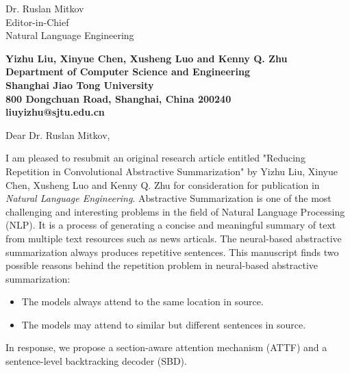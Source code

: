 \documentclass[11pt]{letter} %
\begin{document}

\begin{letter}{Dr. Ruslan Mitkov \\
Editor-in-Chief  \\
Natural Language Engineering} 


\begin{center}
\large\bf Yizhu Liu, Xinyue Chen, Xusheng Luo and Kenny Q. Zhu \\ %
Department of Computer Science and Engineering \\ Shanghai Jiao Tong University \\ 800 Dongchuan Road, Shanghai, China 200240 \\
liuyizhu@sjtu.edu.cn
\end{center} 
\vfill

\signature{Yizhu Liu} %


\opening{Dear Dr. Ruslan Mitkov,} 

I am pleased to resubmit an original research article entitled 
"Reducing Repetition in Convolutional Abstractive Summarization" by Yizhu Liu, Xinyue Chen, Xusheng Luo and Kenny Q. Zhu 
for consideration for publication in \textit{Natural Language Engineering}. 
Abstractive Summarization is one of the most challenging and interesting problems 
in the field of Natural Language Processing (NLP). 
It is a process of generating a concise and meaningful summary of text from multiple text resources 
such as news articals.
The neural-based abstractive summarization always produces repetitive sentences.
This manuscript finds two possible reasons behind the repetition problem in neural-based abstractive summarization: 
\begin{itemize}
\item The models always attend to the same location in source.
\item The models may attend to similar but different sentences in source. 
\end{itemize}
In response, we propose a section-aware attention mechanism (ATTF) and a sentence-level backtracking decoder (SBD).


\end{letter}
\end{document}
